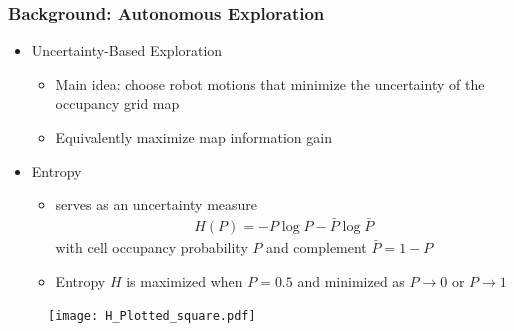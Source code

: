 \documentclass[11pt,professionalfonts,hyperref={pdftex,pdfpagemode=none,pdfstartview=FitH}]{beamer}
\renewcommand{\emph}[1]{\textit{\textbf{\color{blue}{#1}}}}
\begin{document}
\begin{frame}
\frametitle{Background: Autonomous Exploration}
\begin{itemize}
        	\item Uncertainty-Based Exploration
	\begin{itemize}
		\item Main idea: choose robot motions that minimize the uncertainty of the occupancy grid map
		\item Equivalently maximize map information gain
	\end{itemize}
\end{itemize}
\begin{minipage}[t]{7.0cm}
\begin{itemize}
	\item Entropy
	\begin{itemize}		
		\item \emph{Shannon's entropy} serves as an uncertainty measure
		\begin{align*}
			H(P)=-P\log P-\bar{P}\log \bar{P}%
		\end{align*}
		with cell occupancy probability $P$ and complement $\bar{P}=1-P$
		\item Entropy $H$ is maximized when $P=0.5$ and minimized as $P\rightarrow0$ or $P\rightarrow1$
	\end{itemize}
\end{itemize}
\end{minipage}
\begin{minipage}[t]{3.0cm}
\vspace*{0.5cm}
\begin{figure}[!htbp]
	\centerline{
		\hspace*{1.25cm}
   		\texttt{[image: H\_Plotted\_square.pdf]}%
	}
\end{figure}
\end{minipage}

\end{frame}
\end{document}
